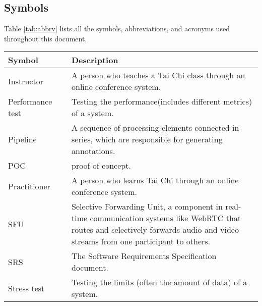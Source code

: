 \documentclass[12pt, titlepage]{article}
\begin{document}
\subsection{Symbols}
Table \ref{tab:abbrv} lists all the symbols, abbreviations, and acronyms used
throughout this document.
\begin{table}[H]
  \centering
  \begin{tabular}{L{0.25\linewidth}L{0.8\linewidth}} \toprule
    \textbf{Symbol}        & \textbf{Description}                                                                                                                                                                     \\ \midrule
    Instructor       & A person who teaches a Tai Chi class through an online conference system.                                                                                                          \\
    Performance test & Testing the performance(includes different metrics) of a system.                                                                                                                   \\ 
    Pipeline         & A sequence of processing elements connected in series, which are responsible for generating annotations.                                                                           \\
    POC              & proof of concept.                                                                                                                                                                  \\
    Practitioner     & A person who learns Tai Chi through an online conference system.                                                                                                                   \\
    SFU              & Selective Forwarding Unit, a component in real-time communication systems like WebRTC that routes and selectively forwards audio and video streams from one participant to others. \\
    SRS              & The Software Requirements Specification document.                                                                                                                                  \\
    Stress test      & Testing the limits (often the amount of data) of a system.                                                                                                                         \\

\end{tabular}
\end{table}
\end{document}
